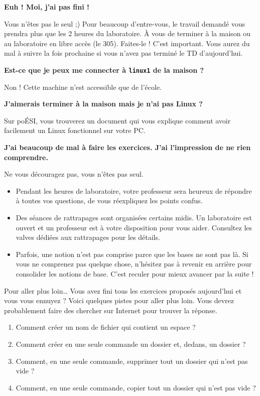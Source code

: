 \documentclass[a4paper,11pt]{style-esi/td}
\begin{document}
	\bigskip
	\begin{faq}
		\textbf{Euh ! Moi, j'ai pas fini !}
		
		Vous n'êtes pas le seul ;)
		Pour beaucoup d'entre-vous, 
		le travail demandé vous prendra plus que les 2 heures du laboratoire.
		À vous de terminer à la maison ou au laboratoire en libre accès (le 305).
		Faites-le ! C'est important.
		Vous aurez du mal à suivre la fois prochaine 
		si vous n'avez pas terminé le TD d'aujourd'hui.
		
		\medskip
		\textbf{Est-ce que je peux me connecter à \texttt{linux1} de la maison ?}
		
		Non ! Cette machine n'est accessible que de l'école.

		\medskip
		\textbf{J'aimerais terminer à la maison mais je n'ai pas Linux ?}
		
		Sur poÉSI, vous trouverez un document qui vous explique
		comment avoir facilement un Linux fonctionnel sur votre PC.

		\medskip
		\textbf{J'ai beaucoup de mal à faire les exercices. 
			J'ai l'impression de ne rien comprendre.}
		
		Ne vous découragez pas, vous n'êtes pas seul.
		\begin{itemize}
		\item 
			Pendant les heures de laboratoire, 
			votre professeur sera heureux de répondre à toutes vos questions,
			de vous réexpliquez les points confus.
		\item 
			Des séances de rattrapages sont organisées certains midis.
			Un laboratoire est ouvert et un professeur est à votre disposition
			pour vous aider. 
			Consultez les valves dédiées aux rattrapages pour les détails.
		\item 
			Parfois, une notion n'est pas comprise 
			parce que les bases ne sont pas là.
			Si vous ne comprenez pas quelque chose,
			n'hésitez pas à revenir en arrière pour consolider les notions de base.
			C'est reculer pour mieux avancer par la suite !
		\end{itemize}
	\end{faq}

	\begin{Exercice}{Pour aller plus loin\dots}
		Vous avez fini tous les exercices proposés aujourd'hui
		et vous vous ennuyez ?
		Voici quelques pistes pour aller plus loin.
		Vous devrez probablement faire des chercher sur Internet
		pour trouver la réponse.
		\begin{enumerate}
		\item 
			Comment créer un nom de fichier qui contient un espace ?
		\item 
			Comment créer en une seule commande un dossier 
			et, dedans, un dossier  ?
		\item 
			Comment, en une seule commande, 
			supprimer tout un dossier qui n'est pas vide ?
		\item 
			Comment, en une seule commande, 
			copier tout un dossier qui n'est pas vide ?
		\end{enumerate}
	\end{Exercice}
\end{document}
